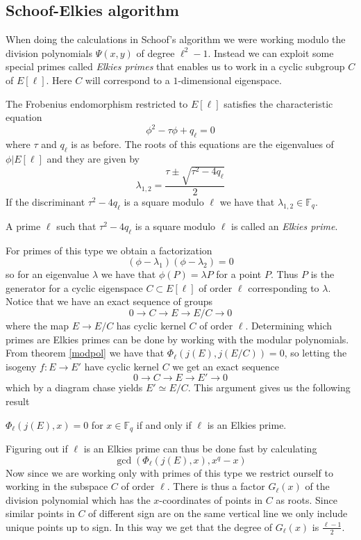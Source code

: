 \subsection{Schoof-Elkies algorithm}
When doing the calculations in Schoof's algorithm we were working modulo the division
polynomials $\Psi(x,y)$ of degree $\ell^2-1$. Instead we can exploit some special primes
called \emph{Elkies primes} that enables us to work in a cyclic subgroup $C$ of $E[\ell]$.
Here $C$ will correspond to a $1$-dimensional eigenspace.

The Frobenius endomorphism restricted to $E[\ell]$ satisfies the characteristic equation
$$ \phi^2 - \tau \phi + q_\ell = 0 $$
where $\tau$ and $q_\ell$ is as before. The roots of this equations are the eigenvalues
of $\phi | E[\ell]$ and they are given by
$$ \lambda_{1,2} = \frac{\tau \pm \sqrt{\tau^2 - 4 q_\ell}}{2} $$
If the discriminant $\tau^2 - 4 q_\ell$ is a square modulo $\ell$ we have that
$\lambda_{1,2} \in \mathbb{F}_q$.
\begin{mydef}
A prime $\ell$ such that $\tau^2 - 4 q_\ell$ is a square modulo $\ell$ is called
an \emph{Elkies prime}.
\end{mydef}
For primes of this type we obtain a factorization
$$ (\phi - \lambda_1)(\phi - \lambda_2) = 0 $$
so for an eigenvalue $\lambda$ we have that $\phi(P) = \lambda P$ for a point $P$. Thus
$P$ is the generator for a cyclic eigenspace $C \subset E[\ell]$ of order $\ell$
corresponding to $\lambda$.
Notice that we have an exact sequence of groups
$$ 0 \rightarrow C \rightarrow E \rightarrow E/C \rightarrow 0 $$
where the map $E \rightarrow E/C$ has cyclic kernel $C$ of order $\ell$.
Determining which primes are Elkies primes can be done by working with the
modular polynomials. From theorem \ref{modpol} we have that $\Phi_\ell(j(E),j(E/C)) = 0$,
so letting the isogeny $f: E \rightarrow E'$ have cyclic kernel $C$ we get an exact
sequence
$$ 0 \rightarrow C \rightarrow E \rightarrow E' \rightarrow 0 $$
which by a diagram chase yields $ E' \simeq E/C $. This argument gives us the following result
\begin{prop}
 $ \Phi_\ell(j(E), x) = 0$ for $x \in \mathbb{F}_q$ if and only if $\ell$ is an Elkies
prime.
\end{prop}
Figuring out if $\ell$ is an Elkies prime can thus be done fast by calculating
$$\gcd(\Phi_\ell(j(E), x), x^q - x)$$
Now since we are working only with primes of this type we restrict ourself to working
in the subspace $C$ of order $\ell$. There is thus a factor $G_\ell(x)$ of the division polynomial
which has the $x$-coordinates of points in $C$ as roots. Since
similar points in $C$ of different sign are on the same vertical line we only include
unique points up to sign. In this way we get that the degree of $G_\ell(x)$ is $\frac{\ell-1}{2}$.

